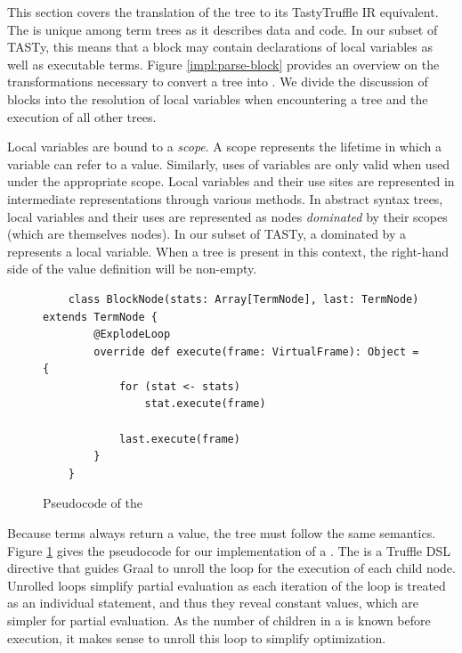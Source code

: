 This section covers the translation of the  tree to its TastyTruffle IR equivalent.
The  is unique among term trees as it describes data and code.
In our subset of TASTy, this means that a block may contain declarations of local variables as well as executable terms.
Figure \ref{impl:parse-block} provides an overview on the transformations necessary to convert a  tree into .
We divide the discussion of blocks into the resolution of local variables when encountering a  tree and the execution of all other trees.

Local variables are bound to a \textit{scope}. 
A scope represents the lifetime in which a variable can refer to a value. 
Similarly, uses of variables are only valid when used under the appropriate scope. 
Local variables and their use sites are represented in intermediate representations through various methods. 
In abstract syntax trees, local variables and their uses are represented as nodes \textit{dominated} by their scopes (which are themselves nodes). 
In our subset of TASTy, a  dominated by a  represents a local variable.
When a  tree is present in this context, the right-hand side of the value definition will be non-empty.

\begin{figure}[!htb]
	\begin{verbatim}
	class BlockNode(stats: Array[TermNode], last: TermNode) extends TermNode {
		@ExplodeLoop
		override def execute(frame: VirtualFrame): Object = {
			for (stat <- stats) 
				stat.execute(frame)
					
			last.execute(frame)
		}
	}
	\end{verbatim}
	\caption{Pseudocode of the }
	\label{impl:block-node}
\end{figure}

Because terms always return a value, the  tree must follow the same semantics.
Figure \ref{impl:block-node} gives the pseudocode for our implementation of a .
The  is a Truffle DSL directive that guides Graal to unroll\cite{loop-unrolling} the loop for the execution of each child node.
Unrolled loops simplify partial evaluation as each iteration of the loop is treated as an individual statement, and thus they reveal constant values, which are simpler for partial evaluation.
As the number of children in a  is known before execution, it makes sense to unroll this loop to simplify optimization.

